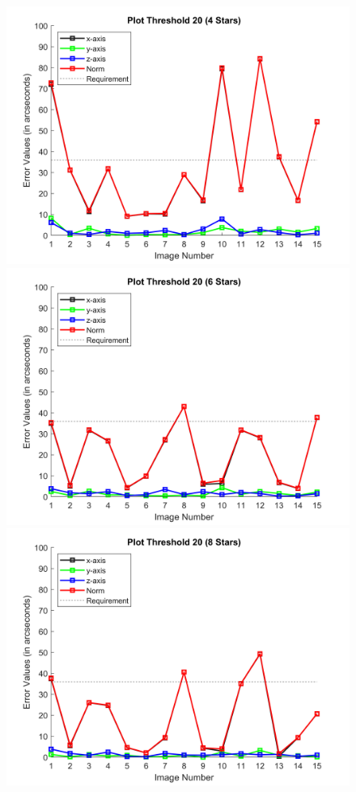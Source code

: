 \documentclass[../../main.tex]{subfiles}
\begin{document}
{{{\begin{figure}
\centering
\includegraphics[scale=0.55]{Figures/GNC/Result_Plot_Threshold_20_4stars.png}
\includegraphics[scale=0.55]{Figures/GNC/Result_Plot_Threshold_20_6stars.png}
\includegraphics[scale=0.55]{Figures/GNC/Result_Plot_Threshold_20_8stars.png}

\end{figure}}}}
\end{document}
